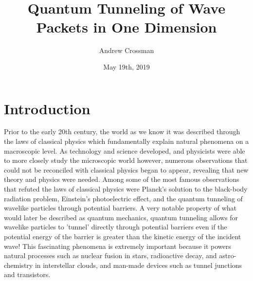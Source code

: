 \documentclass[twocolumn]{article}
\begin{document}
\title{Quantum Tunneling of Wave Packets in One Dimension}
\author{Andrew Crossman}
\date{May 19th, 2019}
\maketitle
\newpage
{}%
\section{Introduction} 
\hspace{\parindent} Prior to the early 20th century, the world as we know it was described through the laws of classical physics which fundamentally explain natural phenomena on a macroscopic level. As technology and science developed, and physicists were able to more closely study the microscopic world however, numerous observations that could not be reconciled with classical physics began to appear, revealing that new theory and physics were needed. Among some of the most famous observations that refuted the laws of classical physics were Planck's solution to the black-body radiation problem, Einstein's photoelectric effect, and the quantum tunneling of wavelike particles through potential barriers. A very notable property of what would later be described as quantum mechanics, quantum tunneling allows for wavelike particles to 'tunnel' directly through potential barriers even if the potential energy of the barrier is greater than the kinetic energy of the incident wave! This fascinating phenomena is extremely important because it powers natural processes such as nuclear fusion in stars, radioactive decay, and astro-chemistry in interstellar clouds, and man-made devices such as tunnel junctions and transistors. 
\end{document}
